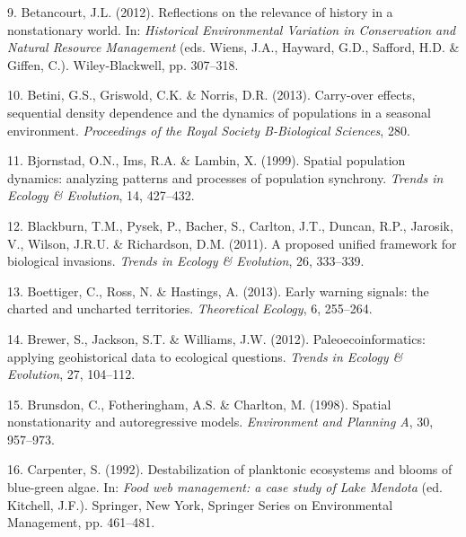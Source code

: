 \documentclass[11pt,a4paper,oneside]{article}
\begin{document}
\begin{thebibliography}{79}
9. Betancourt, J.L. (2012).
\newblock Reflections on the relevance of history in a nonstationary world.
\newblock In: \emph{Historical Environmental Variation in Conservation and
  Natural Resource Management} (eds. Wiens, J.A., Hayward, G.D., Safford, H.D.
  \& Giffen, C.).
\newblock Wiley-Blackwell, pp. 307--318.

10. Betini, G.S., Griswold, C.K. \& Norris, D.R. (2013).
\newblock Carry-over effects, sequential density dependence and the dynamics of
  populations in a seasonal environment.
\newblock \emph{Proceedings of the Royal Society B-Biological Sciences}, 280.

11. Bjornstad, O.N., Ims, R.A. \& Lambin, X. (1999).
\newblock Spatial population dynamics: analyzing patterns and processes of
  population synchrony.
\newblock \emph{Trends in Ecology \& Evolution}, 14, 427--432.

12. Blackburn, T.M., Pysek, P., Bacher, S., Carlton, J.T., Duncan, R.P., Jarosik,
  V., Wilson, J.R.U. \& Richardson, D.M. (2011).
\newblock A proposed unified framework for biological invasions.
\newblock \emph{Trends in Ecology \& Evolution}, 26, 333--339.

13. Boettiger, C., Ross, N. \& Hastings, A. (2013).
\newblock Early warning signals: the charted and uncharted territories.
\newblock \emph{Theoretical Ecology}, 6, 255--264.

14. Brewer, S., Jackson, S.T. \& Williams, J.W. (2012).
\newblock Paleoecoinformatics: applying geohistorical data to ecological
  questions.
\newblock \emph{Trends in Ecology \& Evolution}, 27, 104--112.

15. Brunsdon, C., Fotheringham, A.S. \& Charlton, M. (1998).
\newblock Spatial nonstationarity and autoregressive models.
\newblock \emph{Environment and Planning A}, 30, 957--973.

16. Carpenter, S. (1992).
\newblock Destabilization of planktonic ecosystems and blooms of blue-green
  algae.
\newblock In: \emph{Food web management: a case study of Lake Mendota} (ed.
  Kitchell, J.F.).
\newblock Springer, New York, Springer Series on Environmental Management, pp.
  461--481.


\end{thebibliography}
\end{document}
